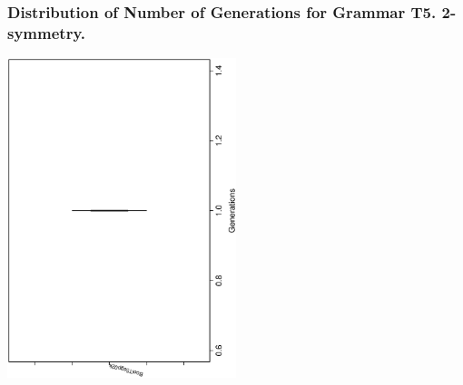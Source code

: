  \begin{frame}
 \frametitle{ Distribution of Number of Generations for Grammar T5. 2-symmetry. }
 \begin{center}
\includegraphics[width=0.5\textwidth, angle=-90]
{ExpFboxplottGenerations000.eps}
 \end{center}
 \label{ExpFboxplottGenerations000.eps}  
 \end{frame}

